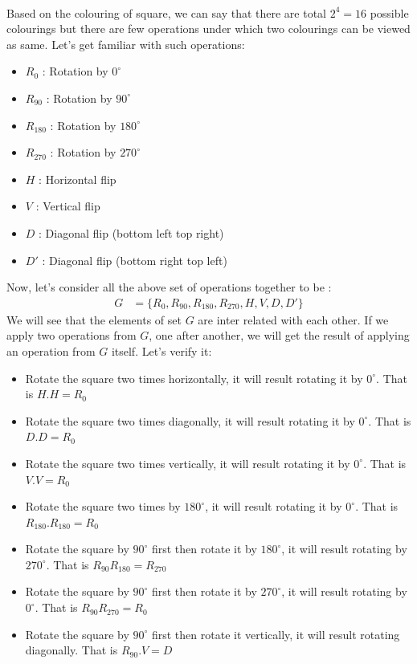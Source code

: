 \paragraph{} 
Based on the colouring of square, we can say that there are total $2^4=16$ possible colourings but there are few operations under which two colourings can be viewed as same. Let's get familiar with such operations:
\begin{itemize}
\item $R_0$ : Rotation by $0^{\circ}$ 
\item $R_{90}$ : Rotation by $90^{\circ}$
\item $R_{180}$ : Rotation by $180^{\circ}$
\item $R_{270}$ : Rotation by $270^{\circ}$
\item $H$ : Horizontal flip
\item $V$ : Vertical flip
\item $D$ : Diagonal flip (bottom left top right)
\item $D'$ : Diagonal flip (bottom right top left)
\end{itemize}
Now, let's consider all the above set of operations together to be :
\begin{align*}
G&=\{R_0,R_{90},R_{180},R_{270},H,V,D,D'\} 
\end{align*}
We will see that the elements of set $G$ are inter related with each other. If we apply two operations from $G$, one after another, we will get the result of applying an operation from $G$ itself. Let's verify it:
\begin{itemize}
\item Rotate the square two times horizontally, it will result rotating it by $0^{\circ}$. That is $H.H=R_0$
\item Rotate the square two times diagonally, it will result rotating it by $0^{\circ}$. That is $D.D=R_0$
\item Rotate the square two times vertically, it will result rotating it by $0^{\circ}$. That is $V.V=R_0$
\item Rotate the square two times by $180^{\circ}$, it will result rotating it by $0^{\circ}$. That is $R_{180}.R_{180}=R_0$
\item Rotate the square by $90^{\circ}$ first then rotate it by $180^{\circ}$, it will result rotating by $270^{\circ}$. That is $R_{90}R_{180}=R_{270}$
\item  Rotate the square by $90^{\circ}$ first then rotate it by $270^{\circ}$, it will result rotating by $0^{\circ}$. That is $R_{90}R_{270}=R_{0}$
\item Rotate the square by $90^{\circ}$ first then rotate it vertically, it will result rotating diagonally. That is $R_{90}.V=D $
\end{itemize}
